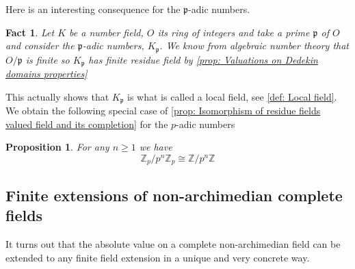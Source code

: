 \documentclass{article}
\newtheorem{proposition}{Proposition}[section]
\newtheorem{fact}{Fact}[section]
\newcommand{\mfrak}[1]{\mathfrak{#1}}
\newcommand{\mbb}[1]{\mathbb{#1}}
\numberwithin{equation}{section}
\begin{document}
Here is an interesting consequence for the $\mfrak p$-adic numbers.
\begin{fact}\label{fact: The P-adic numbers is a local ring}
    Let $K$ be a number field, $O$ its ring of integers and take a prime $\mfrak p$ of $O$ and consider the $\mfrak p$-adic numbers, $K_\mfrak p$. We know from algebraic number theory that $O / \mfrak p$ is finite so $K_\mfrak p$ has finite residue field by \cref{prop: Valuations on Dedekin domains properties}
\end{fact}
This actually shows that $K_\mfrak p$ is what is called a local field, see \cref{def: Local field}. We obtain the following special case of \cref{prop: Isomorphism of residue fields valued field and its completion} for the $p$-adic numbers
\begin{proposition}\label{prop: Isomorphism of residue fields valued field and its completion special case}
    For any $n \geq 1$ we have
    $$\mbb Z_p / p^n \mbb Z_p \cong \mbb Z / p^n \mbb Z$$
\end{proposition}


\subsection{Finite extensions of non-archimedian complete fields}

It turns out that the absolute value on a complete non-archimedian field can be extended to any finite field extension in a unique and very concrete way. 
\end{document}

